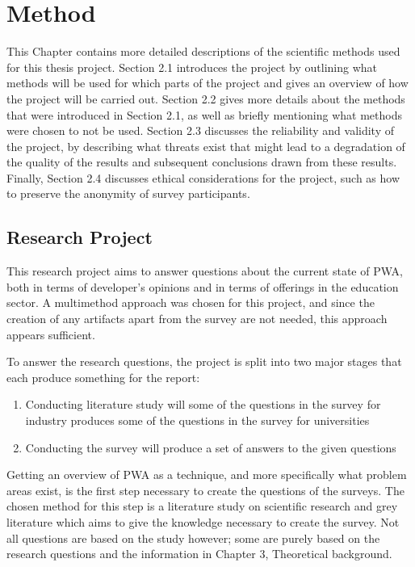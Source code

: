 \documentclass[a4paper,12pt]{article}
\begin{document}
\newpage

\section{Method}
\label{Method}
This Chapter contains more detailed descriptions of the scientific methods used for this thesis project. Section 2.1 introduces the project by outlining what methods will be used for which parts of the project and gives an overview of how the project will be carried out. Section 2.2 gives more details about the methods that were introduced in Section 2.1, as well as briefly mentioning what methods were chosen to not be used. Section 2.3 discusses the reliability and validity of the project, by describing what threats exist that might lead to a degradation of the quality of the results and subsequent conclusions drawn from these results. Finally, Section 2.4 discusses ethical considerations for the project, such as how to preserve the anonymity of survey participants.

\subsection{Research Project}
This research project aims to answer questions about the current state of PWA, both in terms of developer’s opinions and in terms of offerings in the education sector. A multimethod approach was chosen for this project, and since the creation of any artifacts apart from the survey are not needed, this approach appears sufficient.  

To answer the research questions, the project is split into two major stages that each produce something for the report: 

\begin{enumerate}
    \item Conducting literature study will some of the questions in the survey for industry produces some of the questions in the survey for universities
    \item Conducting the survey will produce a set of answers to the given questions
\end{enumerate}

Getting an overview of PWA as a technique, and more specifically what problem areas exist, is the first step necessary to create the questions of the surveys. The chosen method for this step is a literature study on scientific research and grey literature which aims to give the knowledge necessary to create the survey. Not all questions are based on the study however; some are purely based on the research questions and the information in Chapter 3, Theoretical background.
\end{document}
